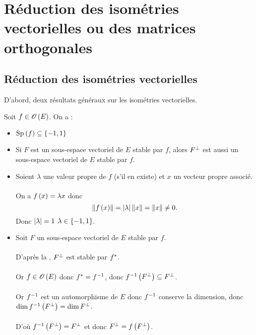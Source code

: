 \section{Réduction des isométries vectorielles ou des matrices orthogonales}

\subsection{Réduction des isométries vectorielles}

D'abord, deux résultats généraux sur les isométries vectorielles.

\begin{prop}
Soit \(f\in\Orth{}[E]\). On a :

\begin{itemize}
    \item \(\Sp{f}\subset\accol{-1,1}\) \\
    \item Si \(F\) est un sous-espace vectoriel de \(E\) stable par \(f\), alors \(F^{\perp}\) est aussi un sous-espace vectoriel de \(E\) stable par \(f\).
\end{itemize}
\end{prop}

\begin{dem}
\begin{itemize}
    \item Soient \(\lambda\) une valeur propre de \(f\) (s'il en existe) et \(x\) un vecteur propre associé. \\\\ On a \(f\left(x\right)=\lambda x\) donc \[\norme{f\paren{x}}=\abs{\lambda}\norme{x}=\norme{x}\not=0.\] Donc \(\left\lvert\lambda\right\rvert=1\) \ie \(\lambda\in\left\lbrace-1,1\right\rbrace\). \\
    \item Soit \(F\) un sous-espace vectoriel de \(E\) stable par \(f\). \\\\ D'après la , \(F^{\perp}\) est stable par \(f^{*}\). \\\\ Or \(f\in\Orth{}[E]\) donc \(f^{*}=f^{-1}\), donc \(f^{-1}\left(F^{\perp}\right)\subseteq F^{\perp}\). \\\\ Or \(f^{-1}\) est un automorphisme de \(E\) donc \(f^{-1}\) conserve la dimension, donc \(\dim f^{-1}\left(F^{\perp}\right)=\dim F^{\perp}\). \\\\ D'où \(f^{-1}\left(F^{\perp}\right)=F^{\perp}\) et donc \(F^{\perp}=f\left(F^{\perp}\right)\).
\end{itemize}
\end{dem}

